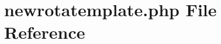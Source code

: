 \hypertarget{newrotatemplate_8php}{}\section{newrotatemplate.\+php File Reference}
\label{newrotatemplate_8php}
